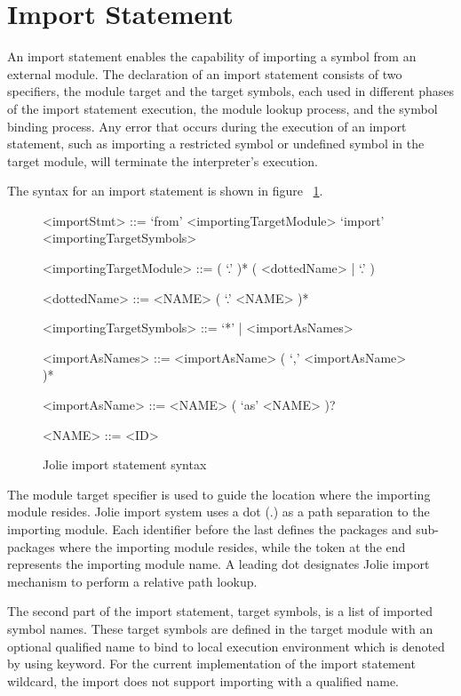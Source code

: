 
\section{Import Statement}

An import statement enables the capability of importing a symbol from an external module. The declaration of an import statement consists of two specifiers, the module target and the target symbols, each used in different phases of the import statement execution, the module lookup process, and the symbol binding process. Any error that occurs during the execution of an import statement, such as importing a restricted symbol or undefined symbol in the target module, will terminate the interpreter's execution.

The syntax for an import statement is shown in figure ~\ref{fig:jolie-import-stmt-syntax}.

\begin{figure}[ht]
    \begin{framed}
        \begin{grammar}
            <importStmt>
            ::= `from' <importingTargetModule> `import' <importingTargetSymbols>

            <importingTargetModule> ::= ( `.' )* ( <dottedName> | `.' )

            <dottedName>
            ::= <NAME> ( `.' <NAME> )*

            <importingTargetSymbols> ::=  `*' | <importAsNames>

            <importAsNames>
            ::= <importAsName> ( `,' <importAsName> )*

            <importAsName>
            ::= <NAME> ( `as' <NAME> )?

            <NAME> ::= <ID>
        \end{grammar}
    \end{framed}
    \caption{Jolie import statement syntax }
    \label{fig:jolie-import-stmt-syntax}
\end{figure}

The module target specifier is used to guide the location where the importing module resides. Jolie import system uses a dot (.) as a path separation to the importing module. Each identifier before the last defines the packages and sub-packages where the importing module resides, while the token at the end represents the importing module name. A leading dot designates Jolie import mechanism to perform a relative path lookup.

The second part of the import statement, target symbols, is a list of imported symbol names. These target symbols are defined in the target module with an optional qualified name to bind to local execution environment which is denoted by using  keyword. For the current implementation of the import statement wildcard, the import does not support importing with a qualified name.